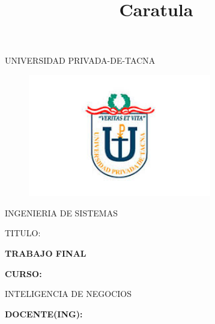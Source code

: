 \documentclass[12pt,letterpaper]{article}
\begin{document}
%


\title{Caratula}

\begin{titlepage}
\begin{center}
\large{UNIVERSIDAD PRIVADA-DE-TACNA}\\
\vspace*{-0.025in}
\begin{figure}[htb]
\begin{center}
\includegraphics[width=8cm]{./Imagenes/logo}
\end{center}
\end{figure}
\vspace*{0.15in}
INGENIERIA DE SISTEMAS  \\
\vspace*{0.5in}
\begin{large}
TITULO:\\
\end{large}
\vspace*{0.1in}
\begin{Large}
\textbf{TRABAJO FINAL} \\
\end{Large}
\vspace*{0.3in}
\begin{Large}
\textbf{CURSO:} \\
\end{Large}
\vspace*{0.1in}
\begin{large}
INTELIGENCIA DE NEGOCIOS\\
\end{large}
\vspace*{0.3in}
\begin{Large}
\textbf{DOCENTE(ING):} \\
\end{Large}

\end{center}
\end{titlepage}
\end{document}

